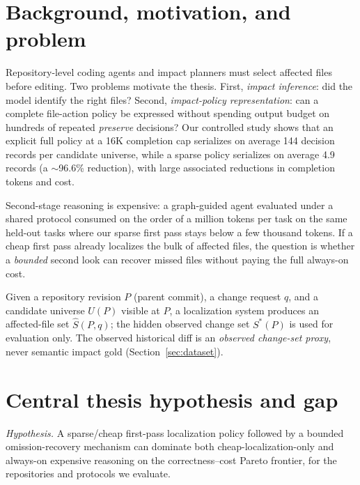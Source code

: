 \documentclass[11pt,a4paper]{article}
\begin{document}
\section{Background, motivation, and problem}
\label{sec:background}

Repository-level coding agents and impact planners must select affected files
before editing. Two problems motivate the thesis. First, \emph{impact
inference}: did the model identify the right files? Second,
\emph{impact-policy representation}: can a complete file-action policy be
expressed without spending output budget on hundreds of repeated
\emph{preserve} decisions? Our controlled study shows that an explicit full
policy at a 16K completion cap serializes on average 144 decision records per
candidate universe, while a sparse policy serializes on average 4.9 records (a
$\sim$96.6\% reduction), with large associated reductions in completion tokens
and cost.

Second-stage reasoning is expensive: a graph-guided agent evaluated under a
shared protocol consumed on the order of a million tokens per task on the same
held-out tasks where our sparse first pass stays below a few thousand tokens.
If a cheap first pass already localizes the bulk of affected files, the
question is whether a \emph{bounded} second look can recover missed files
without paying the full always-on cost.

Given a repository revision $P$ (parent commit), a change request $q$, and a
candidate universe $U(P)$ visible at $P$, a localization system produces an
affected-file set $\hat{S}(P,q)$; the hidden observed change set $S^*(P)$ is
used for evaluation only. The observed historical diff is an \emph{observed
change-set proxy}, never semantic impact gold (Section~\ref{sec:dataset}).

\section{Central thesis hypothesis and gap}
\label{sec:hypothesis}

\emph{Hypothesis.} A sparse/cheap first-pass localization policy followed by a
bounded omission-recovery mechanism can dominate both cheap-localization-only
and always-on expensive reasoning on the correctness--cost Pareto frontier, for
the repositories and protocols we evaluate.
\end{document}

